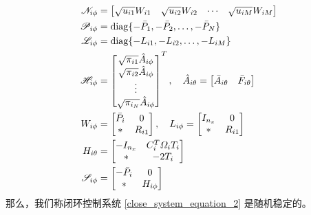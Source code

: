 	\begin{equation}\notag
	\begin{aligned}
	\mathscr{N}_{i\phi}&=\begin{bmatrix}
	\sqrt{u_{i1}}W_{i1}&\sqrt{u_{i2}}W_{i2}&\cdots&\sqrt{u_{iM}}W_{iM}
	\end{bmatrix}\\
	\mathscr{P}_{i\phi}&=\mathrm{diag} \{-\bar{P}_{1},-\bar{P}_{2},\dots,-\bar{P}_{N}  \}\\
	\mathscr{L}_{i\phi}&=\mathrm{diag} \{-L_{i1},-L_{i2},\dots,-L_{iM}  \}\\
	\mathscr{H}_{i\phi}&=\begin{bmatrix}
	\sqrt{\pi_{i1}}\hat{A}_{i\phi}\\
	\sqrt{\pi_{i2}}\hat{A}_{i\phi}\\
	\vdots\\
	\sqrt{\pi_{i_N}}\hat{A}_{i\phi}
	\end{bmatrix}^{T}, \quad
	\hat{A}_{i\theta}=\begin{bmatrix}
	\bar{A}_{i\theta}&\bar{F}_{i\theta}
	\end{bmatrix}  \\
	W_{i\phi}&=\begin{bmatrix}
	\bar{P}_{i}&0\\
	*&R_{i1}
	\end{bmatrix}, \quad
	L_{i\phi}=\begin{bmatrix}
	I_{n_x}&0\\
	*&R_{i1}
	\end{bmatrix}\\
	H_{i\theta}&=\begin{bmatrix}
	-I_{n_x}&C^{T}_{i}\varOmega_{i}T_{i} \\
	*&-2T_{i}
	\end{bmatrix}\\
	\mathscr{S}_{i\phi}&= \begin{bmatrix}
	-\bar{P}_{i}&0\\
	*&H_{i\phi}
	\end{bmatrix}\\
	\end{aligned}
	\end{equation}
	那么，我们称闭环控制系统 \eqref{close_system_equation_2} 是随机稳定的。
	
	
	
	

	
	
	
	
